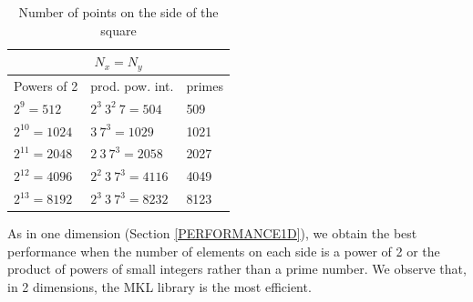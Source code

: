 \documentclass[12pt, a4paper]{article}
\begin{document}
\begin{table}[H]
\captionsetup{width=0.8\linewidth}
\centering
\begin{tabular}{|l|l|l|}
  \hline
  \multicolumn{3}{|c|}{$N_x=N_y$}\\
  \hline
  \hline
Powers of 2 & prod. pow. int. & primes\\ \hline
$2^9=512$ & $2^3\ 3^2\ 7=504$ & 509\\ \hline
$2^{10}=1024$ & $3\ 7^3=1029$ & 1021\\ \hline
$2^{11}=2048$ & $2\ 3\ 7^3=2058$ & 2027\\ \hline
$2^{12}=4096$ & $2^2\ 3\ 7^3=4116$ & 4049\\ \hline
$2^{13}=8192$ & $2^3\ 3\ 7^3=8232$ & 8123\\ \hline
\end{tabular}
\caption{Number of points on the side of the square}\label{SIZES2D}
\end{table}


 As in one dimension (Section \ref{PERFORMANCE1D}), we obtain the best performance when the number of elements on each side is a power of 2 or the product of powers of small integers rather than a prime number. We observe that, in 2 dimensions, the MKL library is the most efficient.
 
\end{document}
